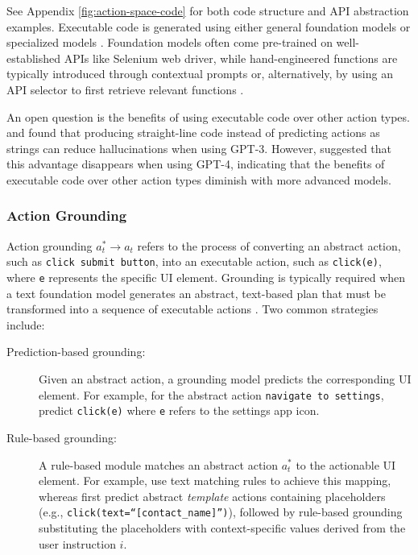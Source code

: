 See Appendix \cref{fig:action-space-code} for both code structure and API abstraction examples.
Executable code is generated using either general foundation models  or specialized models . Foundation models often come pre-trained on well-established APIs like Selenium web driver, while hand-engineered functions are typically introduced through contextual prompts or, alternatively, by using an API selector to first retrieve relevant functions \citep{song_restgpt_2023}.

An open question is the benefits of using executable code over other action types.
\citet{chen_program_2023} and \citet{gao_pal_2023} found that producing straight-line code instead of predicting actions as strings can reduce hallucinations when using GPT-3. 
However, \citet{assouel_unsolved_2023} suggested that this advantage disappears when using GPT-4, indicating that the benefits of executable code over other action types diminish with more advanced models.

\subsubsection{Action Grounding}\label{sec:action_space_grounding}
Action grounding  $a_t^* \rightarrow a_t$ refers to the process of converting an abstract action, such as \texttt{click submit button}, into an executable action, such as \texttt{click(e)}, where \texttt{e} represents the specific UI element. Grounding is typically required when a text foundation model generates an abstract, text-based plan that must be transformed into a sequence of executable actions .
% 
Two common strategies include:

\begin{description}
    \item[Prediction-based grounding:] 
        Given an abstract action, a grounding model predicts the corresponding UI element. For example, for the abstract action \texttt{navigate to settings}, \citet{li_mapping_2020} predict \texttt{click(e)} where \texttt{e} refers to the settings app icon.
    \item[Rule-based grounding:] 
        A rule-based module matches an abstract action $a_t^*$ to the actionable UI element. For example, \citet{song_visiontasker_2024} use text matching rules to achieve this mapping, whereas \citet{lee_explore_2023} first predict abstract \emph{template} actions containing placeholders (e.g., \texttt{click(text=``[contact\_name]'')}), followed by rule-based grounding substituting the placeholders with context-specific values derived from the user instruction $i$.
\end{description}

